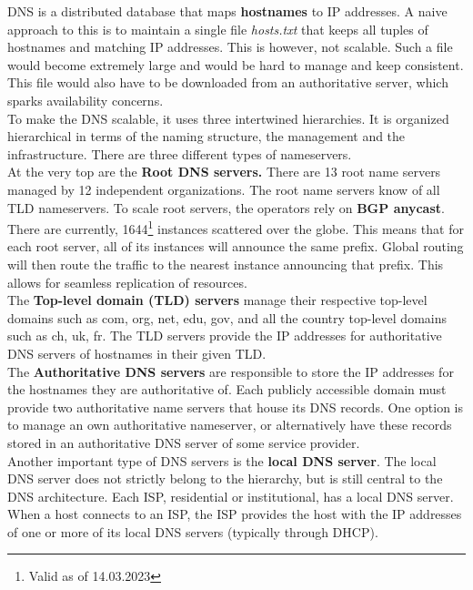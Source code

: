 DNS is a distributed database that maps \textbf{hostnames} to IP addresses. A naive approach to this is to maintain a single file \textit{hosts.txt} that keeps all tuples of hostnames and matching IP addresses. This is however, not scalable. Such a file would become extremely large and would be hard to manage and keep consistent. This file would also have to be downloaded from an authoritative server, which sparks availability concerns. \vspace{.3cm}\\
To make the DNS scalable, it uses three intertwined hierarchies. It is organized hierarchical in terms of the naming structure, the management and the infrastructure. There are three different types of nameservers.\\
At the very top are the \textbf{Root DNS servers.} There are 13 root name servers managed by 12 independent organizations. The root name servers know of all TLD nameservers. To scale root servers, the operators rely on \textbf{BGP anycast}. There are currently, 1644\footnote{Valid as of 14.03.2023} instances scattered over the globe. This means that for each root server, all of its instances will announce the same prefix. Global routing will then route the traffic to the nearest instance announcing that prefix. This allows for seamless replication of resources.\\
The \textbf{Top-level domain (TLD) servers} manage their respective top-level domains such as com, org, net, edu, gov, and all the country top-level domains such as ch, uk, fr. The TLD servers provide the IP addresses for authoritative DNS servers of hostnames in their given TLD.\\
The \textbf{Authoritative DNS servers} are responsible to store the IP addresses for the hostnames they are authoritative of. Each publicly accessible domain must provide two authoritative name servers that house its DNS records. One option is to manage an own authoritative nameserver, or alternatively have these records stored in an authoritative DNS server of some service provider.\vspace{.3cm}\\
Another important type of DNS servers is the \textbf{local DNS server}. The local DNS server does not strictly belong to the hierarchy, but is still central to the DNS architecture. Each ISP, residential or institutional, has a local DNS server. When a host connects to an ISP, the ISP provides the host with the IP addresses of one or more of its local DNS servers (typically through DHCP). \\
